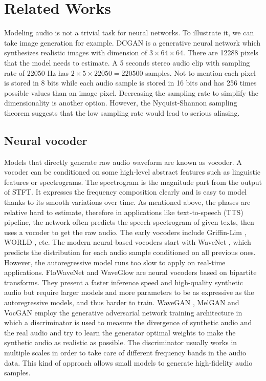 \documentclass[12pt]{article}
\begin{document}
\section{Related Works}
Modeling audio is not a trivial task for neural networks. To illustrate it, we can take image generation for example. DCGAN \cite{rad16} is a generative neural network which synthesizes realistic images with dimension of $3\times 64\times 64$. There are 12288 pixels that the model needs to estimate. A 5 seconds stereo audio clip with sampling rate of 22050 Hz has $2\times 5 \times 22050 = 220500$ samples. Not to mention each pixel is stored in 8 bits while each audio sample is stored in 16 bits and has 256 times possible values than an image pixel. Decreasing the sampling rate to simplify the dimensionality is another option. However, the Nyquist-Shannon sampling theorem suggests that the low sampling rate would lead to serious aliasing.

\subsection{Neural vocoder} Models that directly generate raw audio waveform are known as vocoder. A vocoder can be conditioned on some high-level abstract features such as linguistic features or spectrograms. The spectrogram is the magnitude part from the output of STFT. It expresses the frequency composition clearly and is easy to model thanks to its smooth variations over time. As mentioned above, the phases are relative hard to estimate, therefore in applications like text-to-speech (TTS) \cite{xu21} pipeline, the network often predicts the speech spectrogram of given texts, then uses a vocoder to get the raw audio. The early vocoders include Griffin-Lim \cite{gri84}, WORLD \cite{mor16}, etc. The modern neural-based vocoders start with WaveNet \cite{aar16}, which predicts the distribution for each audio sample conditioned on all previous ones. However, the autoregressive model runs too slow to apply on real-time applications. FloWaveNet \cite{sun18} and WaveGlow \cite{pre19} are neural vocoders based on bipartite transforms. They present a faster inference speed and high-quality synthetic audio but require larger models and more parameters to be as expressive as the autoregressive models, and thus harder to train. WaveGAN \cite{chr18}, MelGAN \cite{kun19} and VocGAN \cite{yan20} employ the generative adversarial network \cite{goo14} training architecture in which a discriminator is used to measure the divergence of synthetic audio and the real audio and try to learn the generator optimal weights to make the synthetic audio as realistic as possible. The discriminator usually works in multiple scales in order to take care of different frequency bands in the audio data. This kind of approach allows small models to generate high-fidelity audio samples.
\end{document}
